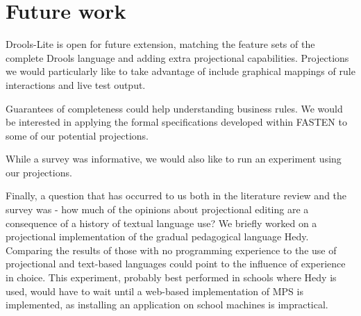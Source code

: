\section{Future work}

Drools-Lite is open for future extension, matching the feature sets of the complete Drools language and adding extra projectional capabilities.
Projections we would particularly like to take advantage of include graphical mappings of rule interactions and live test output.

Guarantees of completeness could help understanding business rules.
We would be interested in applying the formal specifications developed within FASTEN\cite{ratiu2019fasten} to some of our potential projections.

While a survey was informative, we would also like to run an experiment using our projections.

Finally, a question that has occurred to us both in the literature review and the survey was - how much of the opinions about projectional editing are a consequence of a history of textual language use?
We briefly worked on a projectional implementation of the gradual pedagogical language Hedy\cite{hermans2020hedy}.
Comparing the results of those with no programming experience to the use of projectional and text-based languages could point to the influence of experience in choice.
This experiment, probably best performed in schools where Hedy is used, would have to wait until a web-based implementation of MPS is implemented, as installing an application on school machines is impractical.
